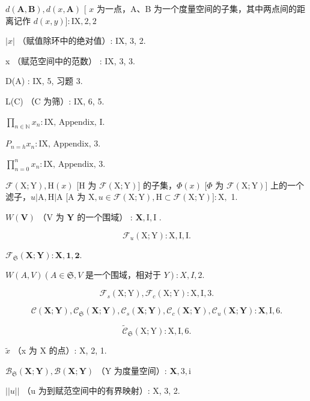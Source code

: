 \(d(\mathbf{A}, \mathbf{B}), d(x, \mathbf{A})\) {[} \(x\) 为一点，A、B 为一个度量空间的子集，其中两点间的距离记作 \(d(x, y)] : \mathrm{IX}, 2, 2\)

\(|x|\) （赋值除环中的绝对值）: IX, 3, 2.

\textbar\textbar x\textbar\textbar{} （赋范空间中的范数） : IX, 3, 3.

D(A) : IX, 5, 习题 3.

L(C) （C 为筛）: IX, 6, 5.

\(\prod_{n \in \mathbb{N}} x_n : \text{IX, Appendix, I.}\)

\(P_{n=h} x_n : \text{IX, Appendix, 3.}\)

\(\prod_{n=0}^{n} x_n: \text{IX, Appendix, 3.}\)

\(\mathcal{F}(\mathrm{X};\mathrm{Y}),\mathrm{H}(x)\) {[}H 为 \(\mathcal{F}(\mathrm{X};\mathrm{Y})]\) 的子集，\(\Phi (x)\) {[}\(\Phi\) 为 \(\mathcal{F}(\mathrm{X};\mathrm{Y})]\) 上的一个滤子，\(u|\mathrm{A},\mathrm{H}|\mathrm{A}\) {[}A 为 \(\mathrm{X},u\in \mathcal{F}(\mathrm{X};\mathrm{Y}),\mathrm{H}\subset \mathcal{F}(\mathrm{X};\mathrm{Y})]:\mathrm{X},\) 1.

\(W(\mathbf{V})\) （V 为 \(\mathbf{Y}\) 的一个围域） : \(\mathbf{X}, \mathrm{I}, \mathrm{I}\) .

\[
\mathcal {F} _ {u} (\mathrm{X}; \mathrm{Y}): \mathrm{X}, \mathrm{I}, \mathrm{I}.
\]

\(\mathcal{F}_{\mathfrak{S}}(\mathbf{X};\mathbf{Y}):\mathbf{X},\mathbf{1},\mathbf{2}.\)

\(W(A, V) (A \in \mathfrak{S}, V \text{ 是一个围域，相对于 } Y): X, I, 2.\)

\[
\mathcal {F} _ {s} (\mathrm{X}; \mathrm{Y}), \mathcal {F} _ {c} (\mathrm{X}; \mathrm{Y}): \mathrm{X}, \mathrm{I}, 3.
\]

\[
\mathcal {C} (\mathbf {X}; \mathbf {Y}), \mathcal {C} _ {\mathfrak {S}} (\mathbf {X}; \mathbf {Y}), \mathcal {C} _ {s} (\mathbf {X}; \mathbf {Y}), \mathcal {C} _ {c} (\mathbf {X}; \mathbf {Y}), \mathcal {C} _ {u} (\mathbf {X}; \mathbf {Y}): \mathbf {X}, \mathrm{I}, 6.
\]

\[
\tilde {\mathcal {C}} _ {\mathfrak {S}} (\mathrm{X}; \mathrm{Y}): \mathrm{X}, \mathrm{I}, 6.
\]

\(\tilde{x}\) （x 为 X 的点）: X, 2, 1.

\(\mathcal{B}_{\mathfrak{S}}(\mathbf{X};\mathbf{Y}),\mathcal{B}(\mathbf{X};\mathbf{Y})\) （Y 为度量空间）: \(\mathbf{X},3,\mathrm{i}\)

\(||u||\) （u 为到赋范空间中的有界映射）: X, 3, 2.

